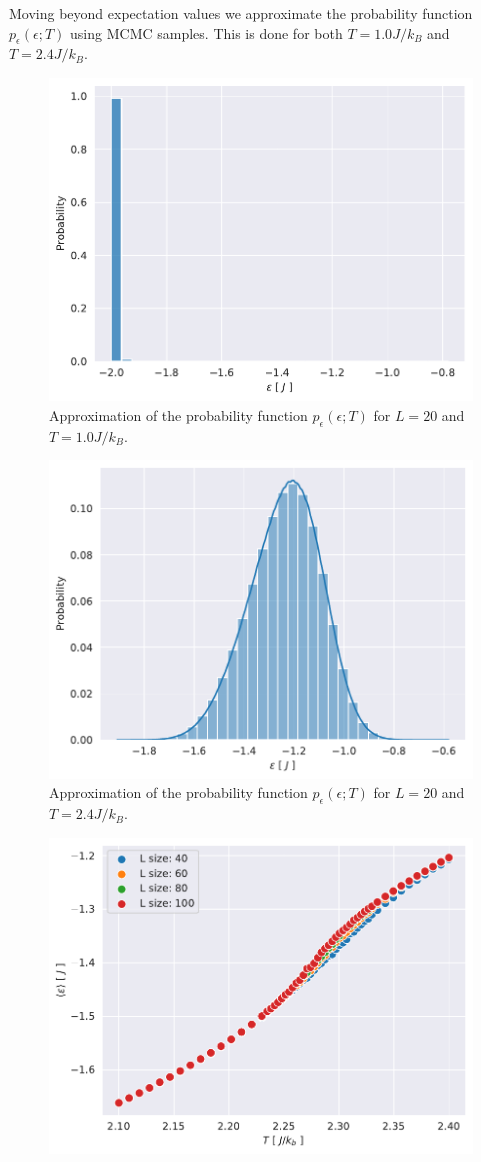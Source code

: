 \documentclass[english,notitlepage,reprint,nofootinbib]{revtex4-1}  %
\begin{document}
Moving beyond expectation values we approximate the probability function $p_{\epsilon}(\epsilon ; T)$ using MCMC samples. This is done for both $T=1.0J/k_B$ and $T=2.4J/k_B$.
\begin{figure}[H]
    \centering
    \includegraphics[width=.5\textwidth]{../figures/histogram_T_1_m.pdf}
    \caption{Approximation of the probability function $p_{\epsilon}(\epsilon ; T)$ for $L=20$ and $T=1.0 J/k_B$.}
    \label{fig:histogram_T_1_m}
\end{figure}

\begin{figure}[H]
    \centering
    \includegraphics[width=.5\textwidth]{../figures/histogram_T_2_4_m.pdf}
    \caption{Approximation of the probability function $p_{\epsilon}(\epsilon ; T)$ for $L=20$ and $T=2.4 J/k_B$.}
    \label{fig:histogram_T_2_4_m}
\end{figure}

\begin{figure}[H]
    \centering
    \includegraphics[width=.5\textwidth]{../figures/L_size_e_T.pdf}
    \caption{}
    \label{fig:}
\end{figure}
\end{document}
